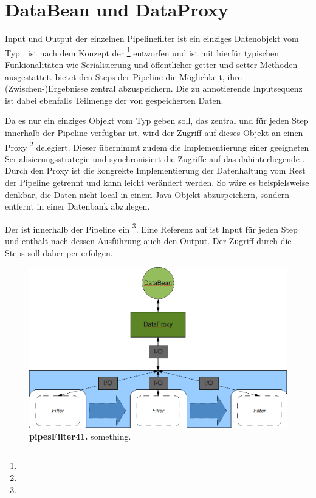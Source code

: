 \section{DataBean und DataProxy}
 \citep{gamma_entwurfsmuster:_2009}
Input und Output der einzelnen Pipelinefilter ist ein einziges
Datenobjekt vom Typ . 
 ist nach dem Konzept der 
\footnote{}
entworfen und ist mit hierfür typischen Funkionalitäten wie Serialisierung und
öffentlicher getter und setter Methoden ausgestattet.
 bietet den Steps der Pipeline die Möglichkeit, ihre
(Zwischen-)Ergebnisse zentral abzuspeichern.
Die zu annotierende Inputsequenz  ist dabei ebenfalls Teilmenge der
von  gespeicherten Daten.

Da es nur ein einziges Objekt vom Typ  geben soll, das zentral
und für jeden Step innerhalb der Pipeline verfügbar ist, wird der Zugriff auf
dieses Objekt an einen Proxy
\footnote{}
delegiert.
Dieser übernimmt zudem die Implementierung einer geeigneten
Serialisierungsstrategie und synchronisiert die Zugriffe auf das
dahinterliegende  .
Durch den Proxy ist die kongrekte Implementierung der Datenhaltung
 vom Rest der Pipeline getrennt und kann leicht verändert
werden.
So wäre es beispielsweise denkbar, die Daten nicht local in einem Java Objekt
abzuspeichern, sondern entfernt in einer Datenbank abzulegen. 

Der  ist innerhalb der Pipeline ein 
\footnote{}.
Eine Referenz auf  ist Input für jeden Step und enthält nach
dessen Ausführung auch den Output.
Der Zugriff durch die Steps soll daher per  erfolgen.

\begin{figure}[htbp]
	\begin{center}
		\includegraphics[scale=0.55]{pics/pipesFilter41.png}
	\caption[pipesFilter41]{
	\textbf{pipesFilter41.}
	something.}
	\end{center}
	\label{fig:pipesFilter41}
\end{figure}

